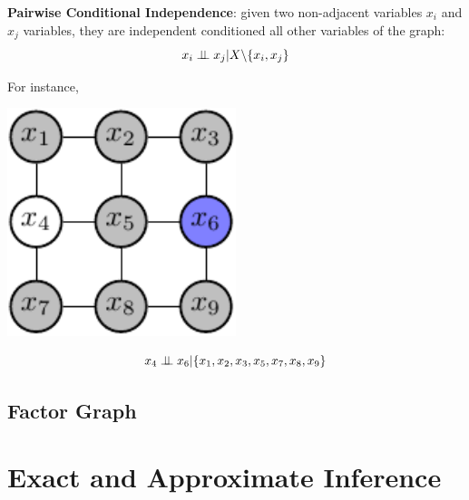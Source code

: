 \begin{corollary}
\textbf{Pairwise Conditional Independence}:
  given two non-adjacent variables $x_i$ and $x_j$ variables, they are independent conditioned all other variables of the graph:
 \begin{equation*}
  x_i \perp\!\!\!\perp x_j | X \backslash \{x_i,x_j\}
 \end{equation*}
\end{corollary}
For instance,  \newline\newline 
\begin{minipage}[c]{0.5\textwidth}   
	\centering
	\includegraphics[width=0.5\textwidth]{./Figures/markov_net_2.pdf}
\end{minipage}
\begin{minipage}[c]{0.4\textwidth}
   \begin{equation*}
    x_4 \perp\!\!\!\perp x_6 |\{x_1,x_2,x_3,x_5,x_7,x_8,x_9\}
   \end{equation*}
\end{minipage}


\subsection{Factor Graph}






\section{Exact and Approximate Inference}


